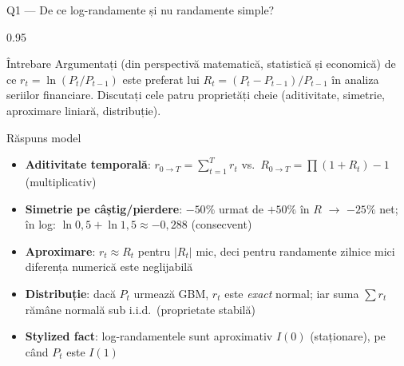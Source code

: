 \documentclass[9pt, aspectratio=169, t]{beamer}
\begin{document}
\begin{frame}[shrink=25]{Q1 --- De ce log-randamente și nu randamente simple?}
\begin{cminipage}{0.95\textwidth}
\begin{block}{Întrebare}
Argumentați (din perspectivă matematică, statistică și economică) de ce $r_t = \ln(P_t/P_{t-1})$ este preferat lui $R_t = (P_t - P_{t-1})/P_{t-1}$ în analiza seriilor financiare. Discutați cele patru proprietăți cheie (aditivitate, simetrie, aproximare liniară, distribuție).
\end{block}
\begin{exampleblock}{Răspuns model}
\begin{itemize}\setlength{\itemsep}{0pt}
    \item \textbf{Aditivitate temporală}: $r_{0\to T} = \sum_{t=1}^T r_t$ \quad vs.\ $R_{0\to T} = \prod (1+R_t) - 1$ (multiplicativ)
    \item \textbf{Simetrie pe câștig/pierdere}: $-50\%$ urmat de $+50\%$ în $R$ $\to$ $-25\%$ net; în log: $\ln 0{,}5 + \ln 1{,}5 \approx -0{,}288$ (consecvent)
    \item \textbf{Aproximare}: $r_t \approx R_t$ pentru $|R_t|$ mic, deci pentru randamente zilnice mici diferența numerică este neglijabilă
    \item \textbf{Distribuție}: dacă $P_t$ urmează GBM, $r_t$ este \emph{exact} normal; iar suma $\sum r_t$ rămâne normală sub i.i.d.\ (proprietate stabilă)
    \item \textbf{Stylized fact}: log-randamentele sunt aproximativ $I(0)$ (staționare), pe când $P_t$ este $I(1)$
\end{itemize}
\end{exampleblock}
\end{cminipage}
\end{frame}
\end{document}

